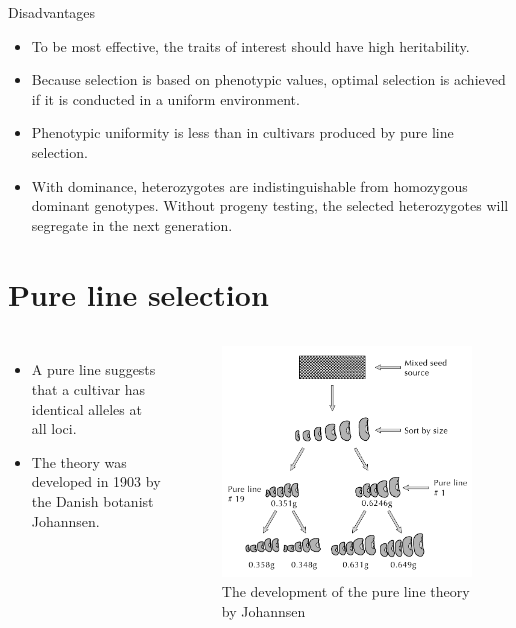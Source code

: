 \documentclass[11pt,ignorenonframetext,aspectratio=169]{beamer}
\providecommand{\tightlist}{%
  \setlength{\itemsep}{0pt}\setlength{\parskip}{0pt}}
\newcommand{\bcolumns}{\begin{columns}[T, onlytextwidth]}
\newcommand{\ecolumns}{\end{columns}}
\begin{document}
\begin{frame}{Disadvantages}
\protect\hypertarget{disadvantages}{}
\begin{itemize}
\tightlist
\item
  To be most effective, the traits of interest should have high
  heritability.
\item
  Because selection is based on phenotypic values, optimal selection is
  achieved if it is conducted in a uniform environment.
\item
  Phenotypic uniformity is less than in cultivars produced by pure line
  selection.
\item
  With dominance, heterozygotes are indistinguishable from homozygous
  dominant genotypes. Without progeny testing, the selected
  heterozygotes will segregate in the next generation.
\end{itemize}
\end{frame}

\hypertarget{pure-line-selection}{%
\section{Pure line selection}\label{pure-line-selection}}

\begin{frame}{}
\protect\hypertarget{section-5}{}
\bcolumns
{}

\begin{itemize}
\tightlist
\item
  A pure line suggests that a cultivar has
  \alert{identical alleles at all loci}.
\item
  The theory was developed in 1903 by the Danish botanist Johannsen.
\end{itemize}

\begin{figure}

{\centering \includegraphics[width=0.75\linewidth]{./images/johannsen_bean} 

}

\caption{The development of the pure line theory by Johannsen}\label{fig:johannsen-bean}
\end{figure}

\ecolumns
\end{frame}
\end{document}

